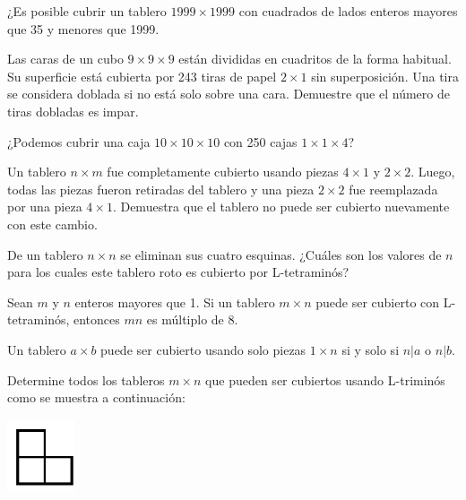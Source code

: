 \documentclass[11pt]{scrartcl}
\begin{document}
\begin{problem}[Rioplatense 1999] ¿Es posible cubrir un tablero $1999 \times 1999$ con cuadrados de lados enteros mayores que 35 y menores que 1999.
\end{problem}

\begin{problem}[Rusia 2007] Las caras de un cubo $9 \times 9 \times 9$ están divididas en cuadritos de la forma habitual. Su superficie está cubierta por 243 tiras de papel $2 \times 1$ sin superposición. Una tira se considera doblada si no está solo sobre una cara. Demuestre que el número de tiras dobladas es impar.
\end{problem}

\begin{problem}
¿Podemos cubrir una caja $10 \times 10 \times 10$ con 250 cajas $1 \times 1 \times 4$?
\end{problem}

\begin{problem}
Un tablero $n \times m$ fue completamente cubierto usando piezas $4 \times 1$ y $2 \times 2$. Luego, todas las piezas fueron retiradas del tablero y una pieza $2 \times 2$ fue reemplazada por una pieza $4 \times 1$. Demuestra que el tablero no puede ser cubierto nuevamente con este cambio.
\end{problem}

\begin{problem}
De un tablero $n \times n$ se eliminan sus cuatro esquinas. ¿Cuáles son los valores de $n$ para los cuales este tablero roto es cubierto por L-tetraminós?
\end{problem}

\begin{problem}
Sean $m$ y $n$ enteros mayores que 1. Si un tablero $m \times n$ puede ser cubierto con L-tetraminós, entonces $mn$ es múltiplo de 8.
\end{problem}

\begin{problem} Un tablero $a \times b$ puede ser cubierto usando solo piezas $1 \times n$ si y solo si $n | a$ o $n | b$.
\end{problem}

\begin{problem}[Rumanía 2000] Determine todos los tableros $m \times n$ que pueden ser cubiertos usando L-triminós como se muestra a continuación:
\begin{center}
    \includegraphics[width=2cm]{images/clase_09_L_trimino.png}
\end{center}
\end{problem}
\end{document}
